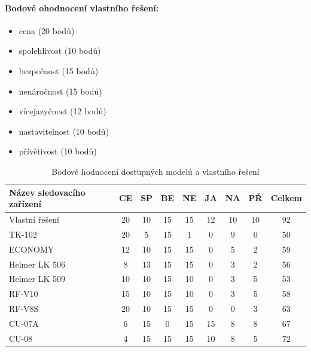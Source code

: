 \documentclass[FM,BP]{tulthesis}  %
\begin{document}
\paragraph{Bodové ohodnocení vlastního řešení:}
\begin{itemize}
\item cena (20 bodů)
\item spolehlivost (10 bodů)
\item bezpečnost (15 bodů)
\item nenáročnost (15 bodů)
\item vícejazyčnost (12 bodů)
\item nastavitelnost (10 bodů)
\item přívětivost (10 bodů)
\end{itemize}

\renewcommand{\arraystretch}{1.5}
\begin{table}[H]
\begin{center}
\begin{tabular}{| l | c | c| c | c | c | c | c | c |}
\hline
Název sledovacího zařízení & CE & SP & BE & NE & JA & NA & PŘ & Celkem\\
\hline
\hline
Vlastní řešení & 20 & 10 & 15 & 15 & 12 & 10 & 10 & 92\\
\hline
TK-102 & 20 & 5 & 15 & 1 & 0 & 9 & 0 & 50\\
\hline
ECONOMY & 12 & 10 & 15 & 15 & 0 & 5 & 2 & 59\\
\hline
Helmer LK 506 & 8 & 13 & 15 & 15 & 0 & 3 & 2 & 56\\
\hline
Helmer LK 509 & 10 & 10 & 15 & 10 & 0 & 3 & 5 & 53\\
\hline
RF-V10 & 15 & 10 & 15 & 10 & 0 & 3 & 5 & 58\\
\hline
RF-V8S & 20 & 10 & 15 & 15 & 0 & 0 & 3 & 63\\
\hline
CU-07A & 6 & 15 & 0 & 15 & 15 & 8 & 8 & 67\\
\hline
CU-08 & 4 & 15 & 15 & 15 & 10 & 8 & 5 & 72\\
\hline
\end{tabular}
\end{center}
\caption{Bodové hodnocení dostupných modelů a vlastního řešení}
\end{table}
\end{document}

